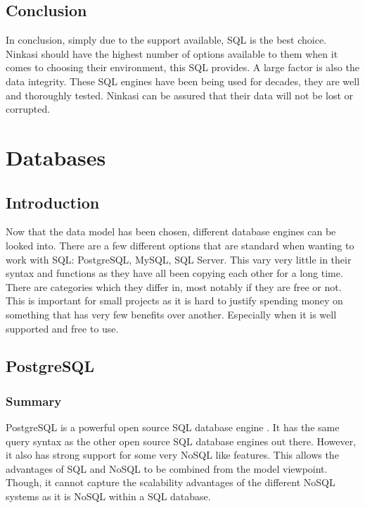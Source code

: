 \documentclass[draftclsnofoot,onecolumn,journal,letterpaper,compsoc,10pt]{IEEEtran}
\begin{document}
    \subsection{Conclusion}

    In conclusion, simply due to the support available, SQL is the best choice.  Ninkasi should have the highest number of options available to them when it comes to choosing their environment, this SQL provides.  A large factor is also the data integrity.  These SQL engines have been being used for decades, they are well and thoroughly tested.  Ninkasi can be assured that their data will not be lost or corrupted.

\section{Databases}

    \subsection{Introduction}
    
    Now that the data model has been chosen, different database engines can be looked into.  There are a few different options that are standard when wanting to work with SQL: PostgreSQL, MySQL, SQL Server.  This vary very little in their syntax and functions as they have all been copying each other for a long time.  There are categories which they differ in, most notably if they are free or not.  This is important for small projects as it is hard to justify spending money on something that has very few benefits over another.  Especially when it is well supported and free to use.
    
    \subsection{PostgreSQL}
    
        \subsubsection{Summary}
        
        PostgreSQL is a powerful open source SQL database engine \cite{postgresql}.  It has the same query syntax as the other open source SQL database engines out there.  However, it also has strong support for some very NoSQL like features.  This allows the advantages of SQL and NoSQL to be combined from the model viewpoint.  Though, it cannot capture the scalability advantages of the different NoSQL systems as it is NoSQL within a SQL database.
        
\end{document}
